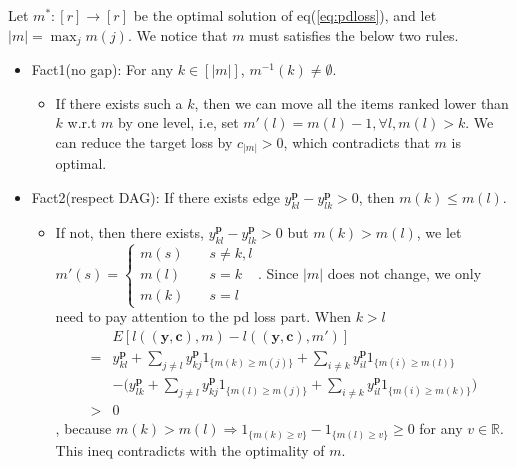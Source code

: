 Let $m^*: [r]\rightarrow [r]$ be the optimal solution of eq(\ref{eq:pdloss}), and let $|m|=\max_jm(j)$. We notice that $m$ must satisfies the below two rules.
\begin{itemize}
	\item Fact1(no gap): For any $k\in[|m|]$, $m^{-1}(k)\not=\emptyset$. 
	\begin{itemize}
		\item If there exists such a $k$, then we can move all the items ranked lower than $k$ w.r.t $m$ by one level, i.e, set $m'(l)=m(l)-1, \forall l, m(l)>k$. We can reduce the target loss by $c_{|m|}>0$, which contradicts that $m$ is optimal.
	\end{itemize}
	\item Fact2(respect DAG): If there exists edge $y_{kl}^\mathbf{p}-y_{lk}^\mathbf{p}>0$, then $m(k)\leq m(l)$.
	\begin{itemize}
		\item If not, then there exists,  $y_{kl}^\mathbf{p}-y_{lk}^\mathbf{p}>0$ but $m(k)>m(l)$, we let $m'(s)=\begin{cases}
		m(s)&\quad{s\not=k,l}\\
		m(l)&\quad{s=k}\\
		m(k)&\quad{s=l}
		\end{cases}$. Since $|m|$ does not change, we only need to pay attention to the pd loss part. When $k>l$ \begin{equation*}
		\begin{split}
		&E[l((\mathbf{y},\mathbf{c}),  m)-l((\mathbf{y},\mathbf{c}),  m')]\\
		=&y_{kl}^\mathbf{p}+\sum\limits_{j\not=l}y_{kj}^\mathbf{p}1_{\{m(k)\geq m(j)\}}+\sum\limits_{i\not=k}y_{il}^\mathbf{p}1_{\{m(i)\geq m(l)\}}\\
		&-\bigg(y_{lk}^\mathbf{p}+\sum\limits_{j\not=l}y_{kj}^\mathbf{p}1_{\{m(l)\geq m(j)\}}+\sum\limits_{i\not=k}y_{il}^\mathbf{p}1_{\{m(i)\geq m(k)\}}\bigg)\\
		>&0
		\end{split}
		\end{equation*}
		, because $m(k)>m(l)\Rightarrow 1_{\{m(k)\geq v\}}-1_{\{m(l)\geq v\}}\geq 0$ for any $v\in \mathbb{R}$. This ineq contradicts with the optimality of $m$. 
	\end{itemize}
\end{itemize}

